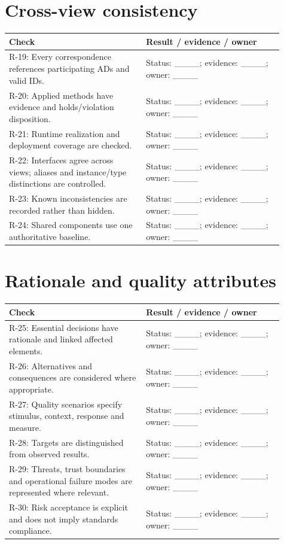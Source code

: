\documentclass[11pt,letterpaper]{article}
\newcommand{\docsection}[1]{\Needspace{5\baselineskip}\section{#1}}
\begin{document}
\docsection{Cross-view consistency}
\begin{longtable}{@{}>{\RaggedRight\arraybackslash}p{0.457\linewidth}>{\RaggedRight\arraybackslash}p{0.457\linewidth}@{}}
\toprule
\textbf{Check} & \textbf{Result / evidence / owner}\\\midrule
\endhead
R-19: Every correspondence references participating ADs and valid IDs. & 
Status: \_\_\_\_; evidence: \_\_\_\_; owner: \_\_\_\_\\
R-20: Applied methods have evidence and holds/violation disposition. & 
Status: \_\_\_\_; evidence: \_\_\_\_; owner: \_\_\_\_\\
R-21: Runtime realization and deployment coverage are checked. & 
Status: \_\_\_\_; evidence: \_\_\_\_; owner: \_\_\_\_\\
R-22: Interfaces agree across views; aliases and instance/type distinctions are controlled. & 
Status: \_\_\_\_; evidence: \_\_\_\_; owner: \_\_\_\_\\
R-23: Known inconsistencies are recorded rather than hidden. & 
Status: \_\_\_\_; evidence: \_\_\_\_; owner: \_\_\_\_\\
R-24: Shared components use one authoritative baseline. & 
Status: \_\_\_\_; evidence: \_\_\_\_; owner: \_\_\_\_\\
\bottomrule
\end{longtable}
\docsection{Rationale and quality attributes}
\begin{longtable}{@{}>{\RaggedRight\arraybackslash}p{0.457\linewidth}>{\RaggedRight\arraybackslash}p{0.457\linewidth}@{}}
\toprule
\textbf{Check} & \textbf{Result / evidence / owner}\\\midrule
\endhead
R-25: Essential decisions have rationale and linked affected elements. & 
Status: \_\_\_\_; evidence: \_\_\_\_; owner: \_\_\_\_\\
R-26: Alternatives and consequences are considered where appropriate. & 
Status: \_\_\_\_; evidence: \_\_\_\_; owner: \_\_\_\_\\
R-27: Quality scenarios specify stimulus, context, response and measure. & 
Status: \_\_\_\_; evidence: \_\_\_\_; owner: \_\_\_\_\\
R-28: Targets are distinguished from observed results. & 
Status: \_\_\_\_; evidence: \_\_\_\_; owner: \_\_\_\_\\
R-29: Threats, trust boundaries and operational failure modes are represented where relevant. & 
Status: \_\_\_\_; evidence: \_\_\_\_; owner: \_\_\_\_\\
R-30: Risk acceptance is explicit and does not imply standards compliance. & 
Status: \_\_\_\_; evidence: \_\_\_\_; owner: \_\_\_\_\\
\bottomrule
\end{longtable}
\end{document}
